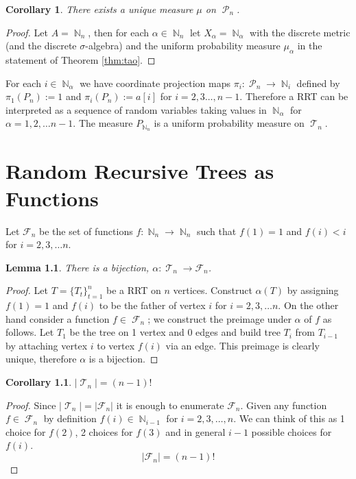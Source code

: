 \documentclass[oneside]{book} %
\newtheorem{lem}[thm]{Lemma}
\newtheorem{cor}[thm]{Corollary}
\theoremstyle{definition}
\numberwithin{equation}{section}
\DeclareMathOperator{\T}{\mathcal{T}}
\DeclareMathOperator{\N}{\mathbb{N}}
\DeclareMathOperator{\Pruf}{\mathcal{P}} %
\DeclareMathOperator{\F}{\mathcal{F}}
\begin{document}
\begin{cor}
 There exists a unique measure $\mu$ on $\Pruf_n$. 
\end{cor}

\begin{proof}
 Let $A = \N_n$, then for each $\alpha \in \N_n$ let $X_\alpha = \N_{\alpha}$ with the discrete metric (and the discrete $\sigma$-algebra) and the uniform probability measure $\mu_{\alpha}$ in the statement of Theorem \ref{thm:tao}.   
\end{proof}

For each $i \in \N_\alpha$ we have coordinate projection maps $\pi_{i} : \Pruf_n \rightarrow \N_i$ defined by $\pi_1(P_n):= 1$ and $\pi_i(P_n):= a[i]$ for $i = 2,3\dots,n-1$.  Therefore a RRT can be interpreted as a sequence of random variables taking values in $\N_{\alpha}$ for $\alpha  = 1,2,\dots n-1$.  The measure $P_{\N_n}$ is a uniform probability measure on $\T_n$.   

\chapter{Random Recursive Trees as Functions}\label{chap:Joyal}
Let $\mathcal{F}_n$ be the set of functions $f: \N_n \longrightarrow \N_n$ such that $f(1) = 1$ and $f(i) <i$ for $i = 2,3,\dots n$.

\begin{lem}
  There is a bijection, $\alpha: \T_n \rightarrow \mathcal{F}_n$.
\end{lem}

\begin{proof}  Let $T = \{T_t\}_{t=1}^n$ be a RRT on $n$ vertices.  Construct $\alpha(T)$ by assigning $f(1) = 1$ and $f(i)$ 
to be the father of vertex $i$ for $i = 2,3,\dots n$. On the other hand consider a function $f \in \F_n$; we construct the
preimage under $\alpha$ of $f$ as follows. Let $T_1$ be the tree on 1 vertex and 0 edges and build tree $T_i$ from $T_{i-1}$ by attaching vertex $i$ to vertex $f(i)$ via an edge. This preimage is clearly unique, therefore $\alpha$ is a bijection.     
\end{proof}

\begin{cor}
$\lvert \T_n \rvert =  (n-1)!$
\end{cor}
\begin{proof}
 Since $\lvert \T_n \rvert = \lvert \mathcal{F}_n \rvert$ it is enough to enumerate $\mathcal{F}_n$.  
Given any function $f \in \F_n$ by definition $f(i) \in \N_{i-1}$ for $i= 2,3,\dots,n$.  We can think of this as 1 choice for $f(2)$, 
2 choices for $f(3)$ and in general $i-1$ possible choices for $f(i)$.  
\[ \lvert \mathcal{F}_n \rvert = (n-1)!\]
\end{proof}
\end{document}
